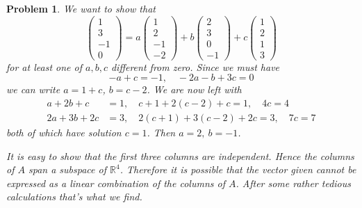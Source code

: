 \documentclass{article}
\theoremstyle{pprop}
\newtheorem{problem}{Problem}[section]
\begin{document}
\begin{problem}
We want to show that
$$
\begin{pmatrix}
1 \\ 3 \\ -1 \\ 0
\end{pmatrix}=
a
\begin{pmatrix}
1 \\ 2 \\ -1 \\ -2
\end{pmatrix}
+b
\begin{pmatrix}
2 \\ 3 \\ 0 \\ -1
\end{pmatrix}
+c
\begin{pmatrix}
1 \\ 2 \\ 1 \\ 3
\end{pmatrix}
$$ 
for at least one of $a,b,c$ different from zero. Since we must have   
$$
-a+c=-1, \quad -2a-b+3c=0
$$
we can write $a=1+c$,  $b=c-2$. We are now left with 
\begin{align*}
a+2b+c&=1, \quad c+1+2(c-2)+c=1, \quad 4c=4 \\
2a+3b+2c&=3, \quad 2(c+1)+3(c-2)+2c=3, \quad 7c=7
\end{align*}
both of which have solution $c=1$. Then $a=2,\ b=-1$.

It is easy to show that the first three columns are independent. Hence the columns of $A$ span a subspace of $\mathbb{R}^4$. 
Therefore it is possible that the vector given cannot be expressed as a linear combination of the columns of $A$. 
After some rather tedious calculations that's what we find.
\end{problem}
\end{document}
